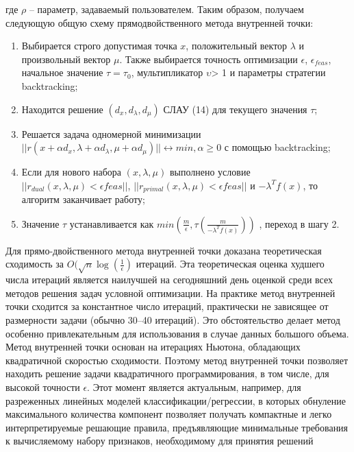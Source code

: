 \documentclass[12pt,a4paper]{article}
\begin{document}
	где $\rho$ – параметр, задаваемый пользователем. Таким образом, получаем следующую общую схему прямодвойственного метода внутренней точки:
	\begin{enumerate}
		\item Выбирается строго допустимая точка $x$, положительный вектор $\lambda$ и произвольный вектор $\mu$. Также выбирается точность оптимизации $\epsilon$, $\epsilon_{feas}$, начальное значение $\tau=\tau_0$, мультипликатор $\upsilon$> 1 и параметры
		стратегии backtracking;
		\item Находится решение $(d_x, d_\lambda, d_\mu)$ СЛАУ (14) для текущего значения $\tau$;
		\item Решается задача одномерной минимизации $	||r(x + \alpha d_x, \lambda +\alpha d_\lambda, \mu + \alpha d_\mu)|| \longleftrightarrow min, \alpha \geq 0$	с помощью backtracking;
		\item  Если для нового набора $(x, \lambda, \mu)$ выполнено условие $||r_{dual} (x, \lambda, \mu) < \epsilon{feas}||$, $||r_{primal} (x, \lambda, \mu) < \epsilon{feas}||$ и $-\lambda^Tf(x)$, то алгоритм заканчивает работу;
		\item Значение $\tau$ устанавливается как $min(\frac{m}{\epsilon}, \tau(\frac{m}{-\lambda^{T}f(x)}))$
		, переход в шагу 2.
	\end{enumerate}


Для прямо-двойственного метода внутренней точки доказана теоретическая сходимость за $O(\sqrt{n}\log(\frac{1}{\epsilon})$
итераций. Эта теоретическая оценка худшего числа итераций является наилучшей на сегодняшний день оценкой
среди всех методов решения задач условной оптимизации. На практике метод внутренней точки сходится за
константное число итераций, практически не зависящее от размерности задачи (обычно 30–40 итераций). Это
обстоятельство делает метод особенно привлекательным для использования в случае данных большого объема.
Метод внутренней точки основан на итерациях Ньютона, обладающих квадратичной скоростью сходимости.
Поэтому метод внутренней точки позволяет находить решение задачи квадратичного программирования, в том числе, для высокой точности $\epsilon$.
Этот момент является актуальным, например, для разреженных линейных моделей классификации/регрессии,
в которых обнуление максимального количества компонент позволяет получать компактные и легко интерпретируемые решающие правила, предъявляющие минимальные требования к вычисляемому набору признаков,
необходимому для принятия решений
\end{document}
